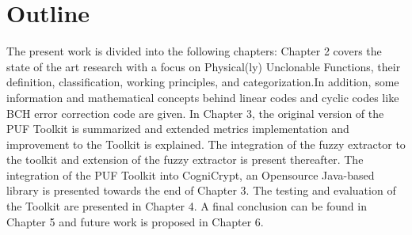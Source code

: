 \section{Outline}
The present work is divided into the following chapters: Chapter 2 covers the state of the art research with a focus on Physical(ly) Unclonable Functions, their definition, classification, working principles, and categorization.In addition, some information and mathematical concepts behind linear codes and cyclic codes like BCH error correction code are given. In Chapter 3, the original version of the PUF Toolkit is summarized and extended metrics implementation and improvement
to the Toolkit is explained. The integration of the fuzzy extractor to the toolkit and extension of the fuzzy extractor is present thereafter. The integration of the PUF Toolkit into CogniCrypt, an Opensource Java-based library is presented towards the end of Chapter 3. The testing and evaluation of the Toolkit are presented in Chapter 4. A final conclusion can be found in Chapter 5 and future work is proposed in Chapter 6.
